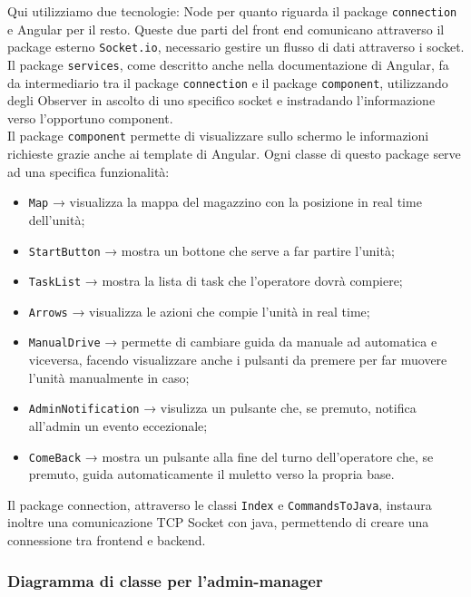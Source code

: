 Qui utilizziamo due tecnologie: Node per quanto riguarda il package \texttt{connection} e Angular per il resto. Queste due parti del front end comunicano attraverso il package esterno \texttt{Socket.io}, necessario gestire un flusso di dati attraverso i socket.\\
Il package \texttt{services}, come descritto anche nella documentazione di Angular, fa da intermediario tra il package \texttt{connection} e il package \texttt{component}, utilizzando degli Observer in ascolto di uno specifico socket e instradando l'informazione verso l'opportuno component.\\
Il package \texttt{component} permette di visualizzare sullo schermo le informazioni richieste grazie anche ai template di Angular. Ogni classe di questo package serve ad una specifica funzionalità:
\begin{itemize}
	\item \texttt{Map} → visualizza la mappa del magazzino con la posizione in real time dell'unità;
	\item \texttt{StartButton} → mostra un bottone che serve a far partire l'unità;
	\item \texttt{TaskList} → mostra la lista di task che l'operatore dovrà compiere;
	\item \texttt{Arrows} → visualizza le azioni che compie l'unità in real time;
	\item \texttt{ManualDrive} → permette di cambiare guida da manuale ad automatica e viceversa, facendo visualizzare anche i pulsanti da premere per far muovere l'unità manualmente in caso;
	\item \texttt{AdminNotification} → visulizza un pulsante che, se premuto, notifica all'admin un evento eccezionale;
	\item \texttt{ComeBack} → mostra un pulsante alla fine del turno dell'operatore che, se premuto, guida automaticamente il muletto verso la propria base.
\end{itemize}
Il package connection, attraverso le classi \texttt{Index} e \texttt{CommandsToJava}, instaura inoltre una comunicazione TCP Socket con java, permettendo di creare una connessione tra frontend e backend.\\

\subsubsection{Diagramma di classe per l'admin-manager}

